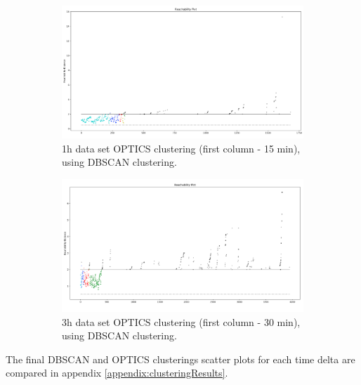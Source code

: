 \begin{figure}[H]
  \centering
  \begin{subfigure}{.5\textwidth}\captionsetup{width=.8\linewidth}
    \centering
    \includegraphics[width=1\textwidth]{./images/clusteringResults/1h-1-reachabilityPlot.png}
  \caption{1h data set OPTICS clustering (first column - 15 min), using DBSCAN clustering.}
  \end{subfigure}%
  \hfill
  \begin{subfigure}{.5\textwidth}\captionsetup{width=.8\linewidth}
    \centering
    \includegraphics[width=1\textwidth]{./images/clusteringResults/3h-1-reachabilityPlot.png}
    \caption{3h data set OPTICS clustering (first column - 30 min), using DBSCAN clustering.}
  \end{subfigure}
  \caption{}
  \label{figure:OPTICSResultsReachabilityPlot}
  \end{figure}



The final DBSCAN and OPTICS clusterings scatter plots for each time delta are compared in appendix \ref{appendix:clusteringResults}.

